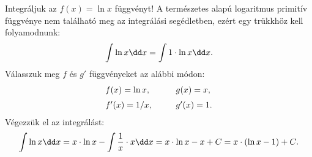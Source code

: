 \begin{mdframed}[style=example, nobreak=true]
  Integráljuk az $f(x) = \ln x$ függvényt! A természetes alapú logaritmus
  primitív függvénye nem található meg az integrálási segédletben, ezért egy
  trükkhöz kell folyamodnunk:
  \[
    \int \ln x \dd x = \int 1 \cdot \ln x \dd x
    \text.
  \]
  Válasszuk meg $f$ és $g'$ függvényeket az alábbi módon:
  \[
    \def\arraycolsep{5mm}
    \begin{array}{ll}
      f(x) = \ln x  \text, &
      g(x) = x      \text,   \\[2mm]
      f'(x) = 1 / x \text, &
      g'(x) = 1     \text.   \\
    \end{array}
  \]
  Végezzük el az integrálást:
  \[
    \int \ln x \dd x
    = x \cdot \ln x
    - \int \frac1x \cdot x \dd x
    = x \cdot \ln x - x + C
    = x \cdot (\ln x - 1) + C
    \text.
  \]
\end{mdframed}

